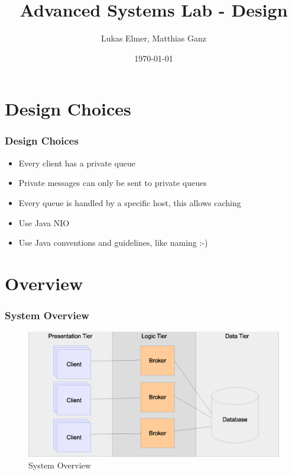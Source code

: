 \documentclass{beamer}
\title{Advanced Systems Lab - Design}
\author{Lukas Elmer, Matthias Ganz}
\date{\today}
\begin{document}

\begin{frame}
\titlepage
\end{frame} 




\section{Design Choices}
\begin{frame}
\frametitle{Design Choices}

\begin{itemize}
\item{Every client has a private queue}
\item{Private messages can only be sent to private queues}
\item{Every queue is handled by a specific host, this allows caching}
\item{Use Java NIO}
\item{Use Java conventions and guidelines, like naming :-)}
\end{itemize}

\end{frame}



\section{Overview}
\begin{frame}
\frametitle{System Overview}

\begin{figure}
  \begin{center}
  
    \includegraphics[scale=0.3]{../../drawings/system-overview.eps}
    
  \end{center}
  \caption{System Overview}
  \label{fig:system-overview}
\end{figure}


\end{frame}
\end{document}
